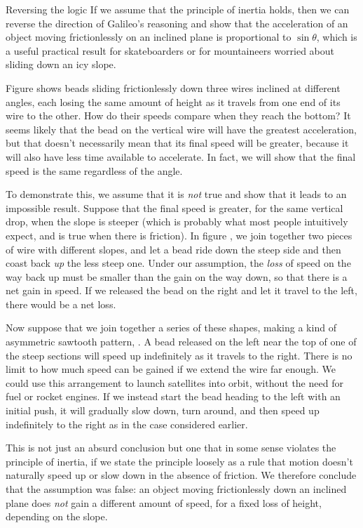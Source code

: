 \begin{eg}{Reversing the logic}\label{eg:sin-theta-proof}
If we assume that the principle of inertia holds, then we can reverse the direction of Galileo's
reasoning and show that the acceleration of an object moving frictionlessly
on an inclined plane is proportional to
$\sin\theta$, which is a useful practical result for skateboarders or for mountaineers worried
about sliding down an icy slope.

Figure  shows beads sliding frictionlessly down three wires
inclined at different angles, each losing the same amount of height as it travels from one end
of its wire to the other. How do their speeds compare when they reach the bottom?
It seems likely that the bead on the vertical wire will have the greatest
acceleration, but that doesn't necessarily mean that its final speed will be greater, because
it will also have less time available to accelerate. In fact, we will show that the final speed
is the same regardless of the angle.

To demonstrate this, we assume that it is \emph{not} true and show that it leads to an impossible
result. Suppose that the final speed is greater, for the same vertical drop, when the slope is steeper
(which is probably what most people intuitively expect, and is true when there is friction).
In figure , we join together two pieces of wire with different
slopes, and let a bead ride down the steep side and then coast back \emph{up} the less steep one.
Under our assumption, the \emph{loss} of speed on the way back up must be smaller than the gain
on the way down, so that there is a net gain in speed. If we released the bead on the right and
let it travel to the left, there would be a net loss.

Now suppose that we join together a series of these shapes, making a kind of asymmetric sawtooth
pattern, . A bead released on the left near the top of one of
the steep sections will speed up indefinitely as it travels to the right. There is no limit to
how much speed can be gained if we extend the wire far enough.
We could use this arrangement to launch satellites into orbit,
without the need for fuel or rocket engines. If we instead start the bead heading to the left
with an initial push, it will gradually slow down, turn around, and then speed up indefinitely
to the right as in the case considered earlier.

This is not just an absurd conclusion but one that in some sense violates the principle of inertia,
if we state the principle loosely as a rule that motion doesn't naturally speed up or slow down
in the absence of friction. We therefore conclude that the assumption was false: an object moving
frictionlessly down an inclined plane does \emph{not} gain a different amount of speed, for a fixed
loss of height, depending on the slope.


\end{eg}

